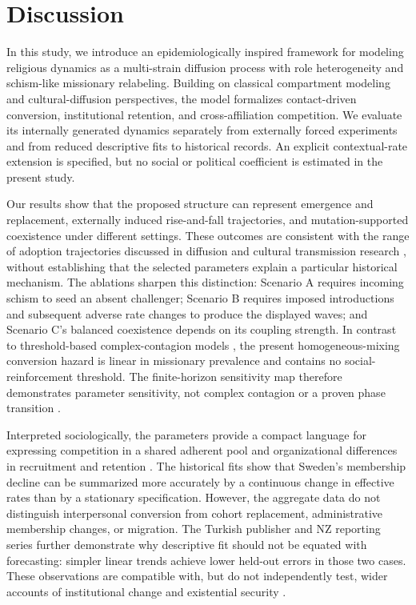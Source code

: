 \section{Discussion}
\label{sec:dicussion}
In this study, we introduce an epidemiologically inspired framework for modeling religious dynamics as a multi-strain diffusion process with role heterogeneity and schism-like missionary relabeling. Building on classical compartment modeling and cultural-diffusion perspectives, the model formalizes contact-driven conversion, institutional retention, and cross-affiliation competition. We evaluate its internally generated dynamics separately from externally forced experiments and from reduced descriptive fits to historical records. An explicit contextual-rate extension is specified, but no social or political coefficient is estimated in the present study.

Our results show that the proposed structure can represent emergence and replacement, externally induced rise-and-fall trajectories, and mutation-supported coexistence under different settings. These outcomes are consistent with the range of adoption trajectories discussed in diffusion and cultural transmission research \cite{rogers2003diffusion,cavalliSforzaFeldman1981cultural,boydRicherson1985culture}, without establishing that the selected parameters explain a particular historical mechanism. The ablations sharpen this distinction: Scenario A requires incoming schism to seed an absent challenger; Scenario B requires imposed introductions and subsequent adverse rate changes to produce the displayed waves; and Scenario C's balanced coexistence depends on its coupling strength. In contrast to threshold-based complex-contagion models \cite{centolaMacy2007complex,reisinger2024patterns}, the present homogeneous-mixing conversion hazard is linear in missionary prevalence and contains no social-reinforcement threshold. The finite-horizon sensitivity map therefore demonstrates parameter sensitivity, not complex contagion or a proven phase transition \cite{fullsack2021regime}.

Interpreted sociologically, the parameters provide a compact language for expressing competition in a shared adherent pool and organizational differences in recruitment and retention \cite{iannaccone1991market}. The historical fits show that Sweden's membership decline can be summarized more accurately by a continuous change in effective rates than by a stationary specification. However, the aggregate data do not distinguish interpersonal conversion from cohort replacement, administrative membership changes, or migration. The Turkish publisher and NZ reporting series further demonstrate why descriptive fit should not be equated with forecasting: simpler linear trends achieve lower held-out errors in those two cases. These observations are compatible with, but do not independently test, wider accounts of institutional change and existential security \cite{berger1967sacredcanopy,norrisInglehart2012sacred,gore2018forecasting}.

